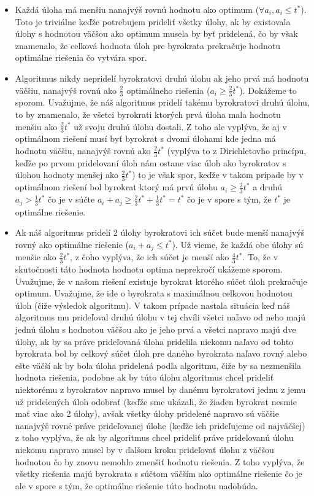 \documentclass[a4paper]{article}
\begin{document}
\begin{itemize}
	\item Každá úloha má menšiu nanajvýš rovnú hodnotu ako optimum ($\forall a_i, a_i \leq t^*$). Toto je triviálne keďže potrebujem prideliť všetky úlohy, ak by existovala úlohy s hodnotou väčšou ako optimum musela by byť pridelená, čo by však znamenalo, že celková hodnota úloh pre byrokrata prekračuje hodnotu optimálne riešenia čo vytvára spor.
	
	\item Algoritmus nikdy nepridelí byrokratovi druhú úlohu ak jeho prvá má hodnotu väčšiu, nanajvýš rovnú ako $\frac{2}{3}$ optimálneho riešenia ($a_i \geq \frac{2}{3}t^*$). Dokážeme to sporom. Uvažujme, že náš algoritmus pridelí takému byrokratovi druhú úlohu, to by znamenalo, že všetci byrokrati ktorých prvá úloha mala hodnotu menšiu ako $\frac{2}{3}t^*$ už svoju druhú úlohu dostali. Z toho ale vyplýva, že aj v optimálnom riešení musí byť byrokrat s dvomi úlohami kde jedna má hodnotu väčšiu, nanajvýš rovnú ako $\frac{2}{3}t^*$ (vyplýva to z Dirichletovho princípu, keďže po prvom pridelovaní úloh nám ostane viac úloh ako byrokratov s úlohou hodnoty menšej ako $\frac{2}{3}t^*$) to je však spor, keďže v takom prípade by v optimálnom riešení bol byrokrat ktorý má prvú úlohu $a_i \geq \frac{2}{3}t^*$ a druhú $a_j > \frac{1}{3}t^*$ čo je v súčte $a_i + a_j \geq \frac{2}{3}t^* + \frac{1}{3}t^* = t^*$ čo je v spore s tým, že $t^*$ je optimálne riešenie.
	
	\item Ak náš algoritmus pridelí 2 úlohy byrokratovi ich súčet bude menší nanajvýš rovný ako optimálne riešenie ($a_i + a_j \leq t^*$).
	Už vieme, že každá obe úlohy sú menšie ako $\frac{2}{3}t^*$, z čoho vyplýva, že ich súčet je menší ako  $\frac{4}{3}t^*$. To, že v skutočnosti táto hodnota hodnotu optima neprekročí ukážeme sporom. Uvažujme, že v našom riešení existuje byrokrat ktorého súčet úloh prekračuje optimum. Uvažujme, že ide o byrokrata s maximálnou celkovou hodnotou úloh (čiže výsledok algoritmu). V takom prípade nastala situácia keď náš algoritmus mu prideľoval druhú úlohu v tej chvíli všetci naľavo od neho majú jednú úlohu s hodnotou väčšou ako je jeho prvá a všetci napravo majú dve úlohy, ak by sa práve prideľovaná úloha pridelila niekomu naľavo od tohto byrokrata bol by celkový súčet úloh pre daného byrokrata naľavo rovný alebo ešte väčší ak by bola úloha pridelená podľa algoritmu, čiže by sa nezmenšila hodnota riešenia, podobne ak by túto úlohu algoritmus chcel prideliť niektorému z byrokratov napravo musel by danému byrokratovi jednu z jemu už pridelených úloh odobrať (keďže sme ukázali, že žiaden byrokrat nesmie mať viac ako 2 úlohy), avšak všetky úlohy pridelené napravo sú väčšie nanajvýš rovné práve prideľovanej úlohe (keďže ich prideľujeme od najväčšej) z toho vyplýva, že ak by algoritmus chcel prideliť práve prideľovanú úlohu niekomu napravo musel by v ďalšom kroku prideľovať úlohu z väčšou hodnotou čo by znovu nemohlo zmenšiť hodnotu riešenia. Z toho vyplýva, že všetky riešenia majú byrokrata s súčtom väčším ako optimálne riešenie čo je ale v spore s tým, že optimálne riešenie túto hodnotu nadobúda.  
\end{itemize}
\end{document}
